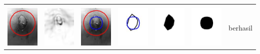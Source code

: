 \begin{table}[H]
\begin{tabular}{|m{0.7in}|m{0.7in}|m{0.7in}|m{0.7in}|m{0.7in}|m{0.7in}|m{0.7in}|}
		&  &  & & & &  \\
		\includegraphics[width=0.7in]{dataset/dataset_3/luka_kuning/ready/19_integer_init.jpg}&
		\includegraphics[width=0.7in]{dataset/dataset_3/luka_kuning/ready/19_integer_ext.jpg}&
		\includegraphics[width=0.7in]{dataset/dataset_3/luka_kuning/ready/19_integer_result.jpg}&
		\includegraphics[width=0.7in]{dataset/dataset_3/luka_kuning/ready/19_gt_r_integer.jpg}&
		\includegraphics[width=0.7in]{dataset/dataset_3/luka_kuning/ready/19_r.jpg}&
		\includegraphics[width=0.7in]{dataset/dataset_3/luka_kuning/ready/19_integer_r.jpg}&
		berhasil\\
		\hline
		

\end{tabular}
\end{table}
